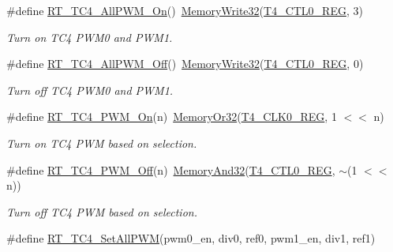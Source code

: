 \begin{DoxyCompactItemize}
\item 
\#define \mbox{\hyperlink{a00050_af7e9317dddf60349a86619afdef1fba8}{R\+T\+\_\+\+T\+C4\+\_\+\+All\+P\+W\+M\+\_\+\+On}}()~\mbox{\hyperlink{a00020_a6b9732365b12e48ddb89fe1028b975b0}{Memory\+Write32}}(\mbox{\hyperlink{a00020_adadaa0ab1ebbd7ba9b70dfd24c3ed44dafd9396894f78b2346881d9f21f33ddac}{T4\+\_\+\+C\+T\+L0\+\_\+\+R\+EG}}, 3)
\begin{DoxyCompactList}\small\item\em Turn on T\+C4 P\+W\+M0 and P\+W\+M1. \end{DoxyCompactList}\item 
\#define \mbox{\hyperlink{a00050_a810820140a90f26db974ea72d81fac27}{R\+T\+\_\+\+T\+C4\+\_\+\+All\+P\+W\+M\+\_\+\+Off}}()~\mbox{\hyperlink{a00020_a6b9732365b12e48ddb89fe1028b975b0}{Memory\+Write32}}(\mbox{\hyperlink{a00020_adadaa0ab1ebbd7ba9b70dfd24c3ed44dafd9396894f78b2346881d9f21f33ddac}{T4\+\_\+\+C\+T\+L0\+\_\+\+R\+EG}}, 0)
\begin{DoxyCompactList}\small\item\em Turn off T\+C4 P\+W\+M0 and P\+W\+M1. \end{DoxyCompactList}\item 
\#define \mbox{\hyperlink{a00050_a383c7817a2e822ccda0e28744c7d3d76}{R\+T\+\_\+\+T\+C4\+\_\+\+P\+W\+M\+\_\+\+On}}(n)~\mbox{\hyperlink{a00020_a27874a97deab7cecdde5ddecf466e31e}{Memory\+Or32}}(\mbox{\hyperlink{a00020_adadaa0ab1ebbd7ba9b70dfd24c3ed44da823ff62ae93ababd0e40840c75bcea22}{T4\+\_\+\+C\+L\+K0\+\_\+\+R\+EG}}, 1 $<$$<$ n)
\begin{DoxyCompactList}\small\item\em Turn on T\+C4 P\+WM based on selection. \end{DoxyCompactList}\item 
\#define \mbox{\hyperlink{a00050_aaa61aa650a6b2f59bbcb78ae836c82e9}{R\+T\+\_\+\+T\+C4\+\_\+\+P\+W\+M\+\_\+\+Off}}(n)~\mbox{\hyperlink{a00020_ad87cedffcaadc51db22594fce55173d4}{Memory\+And32}}(\mbox{\hyperlink{a00020_adadaa0ab1ebbd7ba9b70dfd24c3ed44dafd9396894f78b2346881d9f21f33ddac}{T4\+\_\+\+C\+T\+L0\+\_\+\+R\+EG}}, $\sim$(1 $<$$<$ n))
\begin{DoxyCompactList}\small\item\em Turn off T\+C4 P\+WM based on selection. \end{DoxyCompactList}\item 
\#define \mbox{\hyperlink{a00050_ad6b804bb230129a442fe9ce55e3bd2f6}{R\+T\+\_\+\+T\+C4\+\_\+\+Set\+All\+P\+WM}}(pwm0\+\_\+en,  div0,  ref0,  pwm1\+\_\+en,  div1,  ref1)

\end{DoxyCompactItemize}
